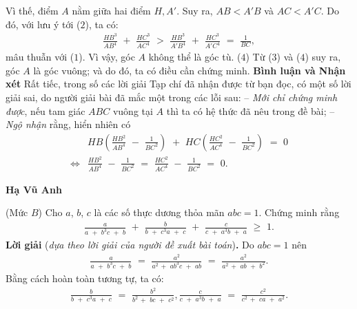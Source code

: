 \begin{multicols}{2}
	Vì thế, điểm $A$ nằm giữa hai điểm $H, A'$. Suy ra, $AB < A'B$ và $AC < A'C$.  Do đó, với lưu ý tới ($2$), ta có:
	\begin{align*}
		\frac{{H{B^3}}}{{A{B^4}}}\,\, + \,\,\frac{{H{C^3}}}{{A{C^4}}}\,\, > \,\,\frac{{H{B^3}}}{{A'{B^4}}}\,\, + \,\,\frac{{H{C^3}}}{{A'{C^4}}}\,\, = \,\,\frac{1}{{BC}},
	\end{align*}
	mâu thuẫn với ($1$). Vì vậy, góc $A$ không thể là góc tù.  \hfill ($4$)
	\vskip 0.05cm
	Từ ($3$) và ($4$) suy ra, góc $A$ là góc vuông; và do đó, ta có điều cần chứng minh.
	\vskip 0.05cm
	\textbf{Bình luận và Nhận xét}
	\vskip 0.05cm
	Rất tiếc, trong số các lời giải Tạp chí đã nhận được từ bạn đọc, có một số lời giải sai, do người giải bài đã mắc một trong các lỗi sau:
	\vskip 0.05cm
	-- \textit{Mới chỉ chứng minh được}, nếu tam giác $ABC$ vuông tại $A$ thì ta có hệ thức đã nêu trong đề bài;
	\vskip 0.05cm
	-- \textit{Ngộ nhận} rằng, hiển nhiên có
	\begin{align*}
		&HB\left( {\frac{{H{B^2}}}{{A{B^4}}}\,\, - \,\,\frac{1}{{B{C^2}}}} \right)\,\, + \,\,HC\left( {\frac{{H{C^2}}}{{A{C^4}}}\,\, - \,\,\frac{1}{{B{C^2}}}} \right)\,\, = \,\,0\\
		\Leftrightarrow &\frac{{H{B^2}}}{{A{B^4}}}\,\, - \,\,\frac{1}{{B{C^2}}}\,\, = \,\,\frac{{H{C^2}}}{{A{C^4}}}\,\, - \,\,\frac{1}{{B{C^2}}}\,\, = \,\,0.
	\end{align*}
	\begin{flushright}
		\textbf{Hạ Vũ Anh}
	\end{flushright}
	{}
	(Mức $B$)
	Cho $a$, $b$, $c$ là các số thực dương thỏa mãn $abc = 1$. Chứng minh rằng
	\begin{align*}
		\frac{a}{{a\,\, + \,\,{b^3}c\,\, + \,\,b}}\,\, + \,\,\frac{b}{{b\,\, + \,\,{c^3}a\,\, + \,\,c}}\,\, + \,\,\frac{c}{{c\,\, + \,\,{a^3}b\,\, + \,\,a}}\,\, \ge \,\,1.
	\end{align*}
	\textbf{Lời giải} (\textit{dựa theo lời giải của người đề xuất bài toán})\textbf{.}
	\vskip 0.05cm
	Do $abc = 1$ nên
	\begin{align*}
		\frac{a}{{a\,\, + \,\,{b^3}c\,\, + \,\,b}}\,\, = \,\,\frac{{{a^2}}}{{{a^2}\, + \,\,a{b^3}c\,\, + \,\,ab}}\,\, = \,\,\frac{{{a^2}}}{{{a^2}\, + \,\,ab\,\, + \,\,{b^2}}}.
	\end{align*}
	Bằng cách hoàn toàn tương tự, ta có:
	\begin{align*}
		\frac{b}{{b\,\, + \,\,{c^3}a\,\, + \,\,c}}\,\, = \,\,\frac{{{b^2}}}{{{b^2}\, + \,\,bc\,\, + \,\,{c^2}}}, \frac{c}{{c\,\, + \,\,{a^3}b\,\, + \,\,a}}\,\, = \,\,\frac{{{c^2}}}{{{c^2}\, + \,\,ca\,\, + \,\,{a^2}}}.

\end{align*}
\end{multicols}
